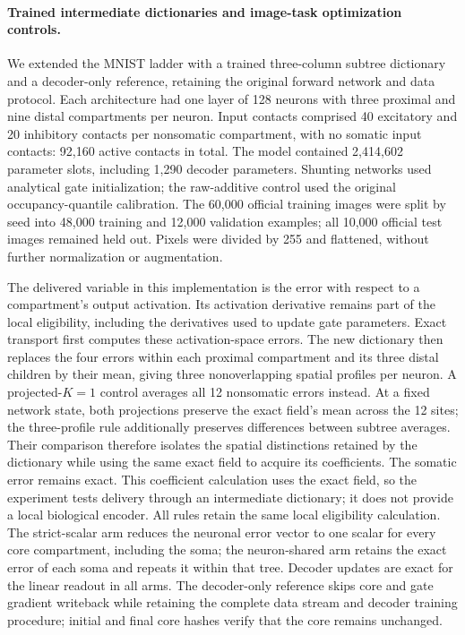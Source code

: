 \paragraph{Trained intermediate dictionaries and image-task optimization controls.}
We extended the MNIST ladder with a trained three-column subtree dictionary and a decoder-only reference, retaining the original forward network and data protocol. Each architecture had one layer of 128 neurons with three proximal and nine distal compartments per neuron. Input contacts comprised 40 excitatory and 20 inhibitory contacts per nonsomatic compartment, with no somatic input contacts: 92,160 active contacts in total. The model contained 2,414,602 parameter slots, including 1,290 decoder parameters. Shunting networks used analytical gate initialization; the raw-additive control used the original occupancy-quantile calibration. The 60,000 official training images were split by seed into 48,000 training and 12,000 validation examples; all 10,000 official test images remained held out. Pixels were divided by 255 and flattened, without further normalization or augmentation.

The delivered variable in this implementation is the error with respect to a compartment's output activation. Its activation derivative remains part of the local eligibility, including the derivatives used to update gate parameters. Exact transport first computes these activation-space errors. The new dictionary then replaces the four errors within each proximal compartment and its three distal children by their mean, giving three nonoverlapping spatial profiles per neuron. A projected-$K=1$ control averages all 12 nonsomatic errors instead. At a fixed network state, both projections preserve the exact field's mean across the 12 sites; the three-profile rule additionally preserves differences between subtree averages. Their comparison therefore isolates the spatial distinctions retained by the dictionary while using the same exact field to acquire its coefficients. The somatic error remains exact. This coefficient calculation uses the exact field, so the experiment tests delivery through an intermediate dictionary; it does not provide a local biological encoder. All rules retain the same local eligibility calculation. The strict-scalar arm reduces the neuronal error vector to one scalar for every core compartment, including the soma; the neuron-shared arm retains the exact error of each soma and repeats it within that tree. Decoder updates are exact for the linear readout in all arms. The decoder-only reference skips core and gate gradient writeback while retaining the complete data stream and decoder training procedure; initial and final core hashes verify that the core remains unchanged.

